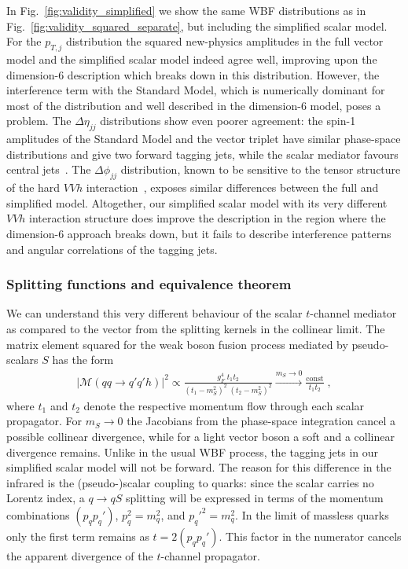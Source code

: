 In Fig.~\ref{fig:validity_simplified} we show the same WBF distributions as in
Fig.~\ref{fig:validity_squared_separate}, but including the simplified scalar
model. For the $p_{T,j}$ distribution the squared new-physics
amplitudes in the full vector model and the simplified scalar model
indeed agree well, improving upon the dimension-6 description which
breaks down in this distribution.  However, the interference term with
the Standard Model, which is numerically dominant for most of the
distribution and well described in the dimension-6 model, poses a
problem.  The $\Delta \eta_{jj}$ distributions show even poorer
agreement: the spin-1 amplitudes of the Standard Model and the vector
triplet have similar phase-space distributions and give two forward
tagging jets, while the scalar mediator favours central
jets~\cite{spins2}.  The $\Delta \phi_{jj}$ distribution, known to be
sensitive to the tensor structure of the hard $VVh$
interaction~\cite{delta_phi}, exposes similar differences between the
full and simplified model.  Altogether, our simplified scalar model
with its very different $VVh$ interaction structure does improve the
description in the region where the dimension-6 approach breaks down,
but it fails to describe interference patterns and angular
correlations of the tagging jets.



\subsubsection*{Splitting functions and equivalence theorem}

We can understand this very different behaviour of the scalar
$t$-channel mediator as compared to the vector from the splitting
kernels in the collinear limit.  The matrix element squared for the
weak boson fusion process mediated by pseudo-scalars $S$ has the form
%
\begin{align}
 | \mathcal{M}(qq \to q'q'h) |^2 \propto 
  \frac{g_F^4 \;  t_1 t_2}{(t_1 - m_S^2)^2 \; (t_2 - m_S^2)^2} 
\stackrel{m_S \to 0}{\longrightarrow} \frac{\text{const}}{t_1 t_2} \; ,
\end{align}
%
where $t_1$ and $t_2$ denote the respective momentum flow through each
scalar propagator. For $m_S \to 0$ the Jacobians from the phase-space
integration cancel a possible collinear divergence, while for a light
vector boson a soft and a collinear divergence remains. Unlike in the
usual WBF process, the tagging jets in our simplified scalar model
will not be forward.  The reason for this difference in the
infrared is the (pseudo-)scalar coupling to quarks: since the scalar
carries no Lorentz index, a $q \to q S$ splitting will be expressed in
terms of the momentum combinations $(p_q p_q')$, $p_q^2 = m_q^2$, and
$p_q'^2 = m_q^2$. In the limit of massless quarks only the first term
remains as $t = 2 (p_q p_q')$.  This factor in the numerator cancels
the apparent divergence of the $t$-channel propagator.

